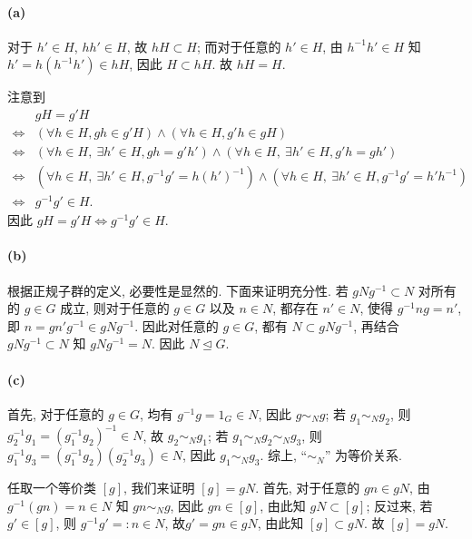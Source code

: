 \documentclass{article}
\begin{document}
\begin{solution}
	\paragraph{(a)} 对于 $h' \in H$, $hh' \in H$, 故 $hH \subset H$; 而对于任意的 $h' \in H$, 由 $h^{-1}h' \in H$ 知 $h' = h(h^{-1}h') \in hH	$, 因此 $H \subset hH$. 故 $hH = H$. 

	注意到
	\[ \begin{array}{cc}
		 & gH = g'H \\
		\Leftrightarrow & (\forall h \in H, gh \in g'H) \wedge (\forall h \in H, g'h \in gH) \\
		\Leftrightarrow & (\forall h \in H,\ \exists h' \in H, gh = g'h') \wedge (\forall h \in H,\ \exists h' \in H, g'h = gh') \\
		\Leftrightarrow & (\forall h \in H,\ \exists h' \in H, g^{-1}g' = h(h')^{-1}) \wedge (\forall h \in H,\ \exists h' \in H, g^{-1}g' = h'h^{-1}) \\
		\Leftrightarrow & g^{-1} g' \in H.
	\end{array} \]
	因此 $gH = g'H \Leftrightarrow g^{-1}g' \in H$.

	\paragraph{(b)} 根据正规子群的定义, 必要性是显然的. 下面来证明充分性. 若 $gNg^{-1} \subset N$ 对所有的 $g \in G$ 成立, 则对于任意的 $g \in G$ 以及 $n \in N$, 都存在 $n' \in N$, 使得 $g^{-1}ng = n'$, 即 $n = gn'g^{-1} \in gNg^{-1}$. 因此对任意的 $g \in G$, 都有 $N \subset gNg^{-1}$, 再结合 $gNg^{-1} \subset N$ 知 $gNg^{-1} = N$. 因此 $N \unlhd G$. 

	\paragraph{(c)} 首先, 对于任意的 $g \in G$, 均有 $g^{-1}g = 1_G \in N$, 因此 $g \sim_N g$; 若 $g_1 \sim_{N} g_2$, 则 $g_2^{-1}g_1 = (g_1^{-1}g_2)^{-1} \in N$, 故 $g_2 \sim_N g_1$; 若 $g_1 \sim_N g_2 \sim_N g_3$, 则 $g_1^{-1}g_3 = (g_1^{-1}g_2)(g_2^{-1}g_3) \in N$, 因此 $g_1 \sim_N g_3$. 综上, ``$\sim_N$'' 为等价关系.

	任取一个等价类 $[g]$, 我们来证明 $[g] = gN$. 首先, 对于任意的 $gn \in gN$, 由 $g^{-1}(gn) = n \in N$ 知 $gn \sim_N g$, 因此 $gn \in [g]$, 由此知 $gN \subset [g]$; 反过来, 若 $g' \in [g]$, 则 $g^{-1}g' =: n \in N$, 故$g' = gn \in gN$, 由此知 $[g] \subset gN$. 故 $[g] = gN$. 


\end{solution}
\end{document}
